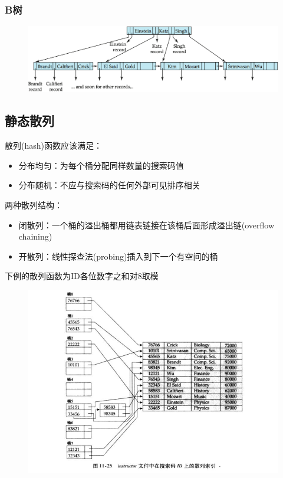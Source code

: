 \subsubsection{B树}
\begin{figure}[H]
\centering
\includegraphics[width=0.8\linewidth]{fig/b-tree.png}
\end{figure}

\subsection{静态散列}
散列(hash)函数应该满足：
\begin{itemize}
	\item 分布均匀：为每个桶分配同样数量的搜索码值
	\item 分布随机：不应与搜索码的任何外部可见排序相关
\end{itemize}

两种散列结构：
\begin{itemize}
	\item 闭散列：一个桶的溢出桶都用链表链接在该桶后面形成溢出链(overflow chaining)
	\item 开散列：线性探查法(probing)插入到下一个有空间的桶
\end{itemize}

下例的散列函数为ID各位数字之和对8取模
\begin{figure}[H]
\centering
\includegraphics[width=0.8\linewidth]{fig/hash_index.png}
\end{figure}

